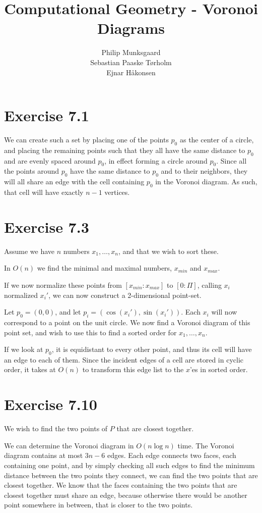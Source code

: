 \documentclass[11pt,a4paper]{article}
\title{Computational Geometry - Voronoi Diagrams}
\author{Philip Munksgaard \\ Sebastian Paaske Tørholm \\ Ejnar Håkonsen}
\begin{document}
\maketitle

\section{Exercise 7.1}

We can create such a set by placing one of the points $p_0$ as the
center of a circle, and placing the remaining points such that they
all have the same distance to $p_0$ and are evenly spaced around
$p_0$, in effect forming a circle around $p_0$. Since all the points
around $p_0$ have the same distance to $p_0$ and to their neighbors,
they will all share an edge with the cell containing $p_0$ in the
Voronoi diagram. As such, that cell will have exactly $n-1$ vertices.

\section{Exercise 7.3}
Assume we have $n$ numbers $x_1, \ldots, x_n$, and that we wish to sort these.

In $O(n)$ we find the minimal and maximal numbers, $x_{min}$
and $x_{max}$.

If we now normalize these points from $[x_{min} : x_{max}]$ to $[0 : \Pi]$, calling
$x_i$ normalized $x_i'$, we can now construct a 2-dimensional point-set.

Let $p_0 = (0,0)$, and let $p_i = (\cos(x_i'), \sin(x_i'))$. Each $x_i$ will
now correspond to a point on the unit circle. We now find a Voronoi diagram of
this point set, and wish to use this to find a sorted order for $x_1, \ldots,
x_n$.

If we look at $p_0$, it is equidistant to every other point, and thus its cell
will have an edge to each of them. Since the incident edges of a cell are
stored in cyclic order, it takes at $O(n)$ to transform this edge list to the
$x$'es in sorted order.

\section{Exercise 7.10}

We wish to find the two points of $P$ that are closest together.

We can determine the Voronoi diagram in $O(n \log n)$ time. The
Voronoi diagram contains at most $3n-6$ edges. Each edge connects two
faces, each containing one point, and by simply checking all such
edges to find the minimum distance between the two points they
connect, we can find the two points that are closest together. We know
that the faces containing the two points that are closest together
must share an edge, because otherwise there would be another point
somewhere in between, that is closer to the two points.
\end{document}
